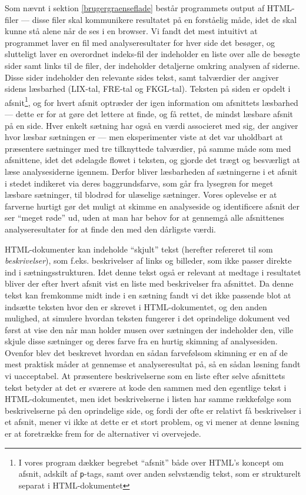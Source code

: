 \documentclass[a4paper,oneside]{memoir}
\begin{document}
Som nævnt i sektion \ref{brugergraenseflade} består programmets output
af HTML-filer --- disse filer skal kommunikere resultatet på en
forståelig måde, idet de skal kunne stå alene når de ses i en
browser. Vi fandt det mest intuitivt at programmet laver en fil med
analyseresultater for hver side det besøger, og slutteligt laver en
overordnet indeks-fil der indeholder en liste over alle de besøgte
sider samt links til de filer, der indeholder detaljerne omkring
analysen af siderne. Disse sider indeholder den relevante sides tekst,
samt talværdier der angiver sidens læsbarhed (LIX-tal, FRE-tal og
FKGL-tal). Teksten på siden er opdelt i afsnit\footnote{I vores
  program dækker begrebet ``afsnit'' både over HTML's koncept om
  afsnit, adskilt af \texttt{p}-tags, samt over anden selvstændig
  tekst, som er strukturelt separat i HTML-dokumentet}, og for hvert
afsnit optræder der igen information om afsnittets læsbarhed --- dette
er for at gøre det lettere at finde, og få rettet, de mindst læsbare
afsnit på en side. Hver enkelt sætning har også en værdi associeret
med sig, der angiver hvor læsbar sætningen er --- men eksperimenter
viste at det var uholdbart at præsentere sætninger med tre tilknyttede
talværdier, på samme måde som med afsnittene, idet det ødelagde flowet
i teksten, og gjorde det trægt og besværligt at læse analysesiderne
igennem. Derfor bliver læsbarheden af sætningerne i et afsnit i stedet
indikeret via deres baggrundsfarve, som går fra lysegrøn for meget
læsbare sætninger, til blodrød for ulæselige sætninger. Vores
oplevelse er at farverne hurtigt gør det muligt at skimme en
analyseside og identificere afsnit der ser ``meget røde'' ud, uden at
man har behov for at gennemgå alle afsnittenes analyseresultater for
at finde den med den dårligste værdi.

HTML-dokumenter kan indeholde ``skjult'' tekst (herefter refereret til
som \textit{beskrivelser}), som f.eks. beskrivelser af links og
billeder, som ikke passer direkte ind i sætningsstrukturen. Idet denne
tekst også er relevant at medtage i resultatet bliver der efter hvert
afsnit vist en liste med beskrivelser fra afsnittet. Da denne tekst
kan fremkomme midt inde i en sætning fandt vi det ikke passende blot
at indsætte teksten hvor den er skrevet i HTML-dokumentet, og den
anden mulighed, at simulere hvordan teksten fungerer i det oprindelige
dokument ved først at vise den når man holder musen over sætningen der
indeholder den, ville skjule disse sætninger og deres farve fra en
hurtig skimning af analysesiden. Ovenfor blev det beskrevet hvordan en
sådan farvefølsom skimning er en af de mest praktisk måder at gennemse
et analyseresultat på, så en sådan løsning fandt vi uacceptabel. At
præsentere beskrivelserne som en liste efter selve afsnittets tekst
betyder at det er sværere at kode den sammen med den egentlige tekst i
HTML-dokumentet, men idet beskrivelserne i listen har samme rækkefølge
som beskrivelserne på den oprindelige side, og fordi der ofte er
relativt få beskrivelser i et afsnit, mener vi ikke at dette er et
stort problem, og vi mener at denne løsning er at foretrække frem for
de alternativer vi overvejede.
\end{document}
